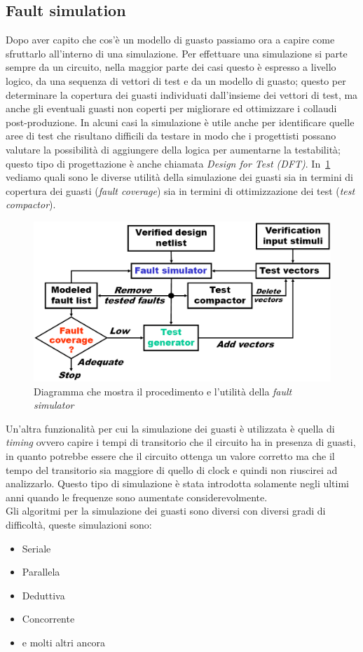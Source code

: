 \subsection{Fault simulation}
Dopo aver capito che cos'è un modello di guasto passiamo ora a capire come sfruttarlo all'interno di una simulazione.
Per effettuare una simulazione si parte sempre da un circuito, nella maggior parte dei casi questo è espresso a livello logico, da una sequenza di vettori di test e da un modello di guasto; questo per determinare la copertura dei guasti individuati dall'insieme dei vettori di test, ma anche gli eventuali guasti non coperti per migliorare ed ottimizzare i collaudi post-produzione.
In alcuni casi la simulazione è utile anche per identificare quelle aree di test che risultano difficili da testare in modo che i progettisti possano valutare la possibilità di aggiungere della logica per aumentarne la testabilità; questo tipo di progettazione è anche chiamata \emph{Design for Test (DFT)}.
In \figurename\,\ref{fig:testschema} vediamo quali sono le diverse utilità della simulazione dei guasti sia in termini di copertura dei guasti (\emph{fault coverage}) sia in termini di ottimizzazione dei test (\emph{test compactor}).
\begin{figure}
\centering
\includegraphics[scale=0.35]{img/testschema.png}
\caption{Diagramma che mostra il procedimento e l'utilità della \emph{fault simulator}}\label{fig:testschema}
\end{figure}
Un'altra funzionalità per cui la simulazione dei guasti è utilizzata è quella di \emph{timing} ovvero capire i tempi di transitorio che il circuito ha in presenza di guasti, in quanto potrebbe essere che il circuito ottenga un valore corretto ma che il tempo del transitorio sia maggiore di quello di clock e quindi non riuscirei ad analizzarlo. Questo tipo di simulazione è stata introdotta solamente negli ultimi anni quando le frequenze sono aumentate considerevolmente.\\
Gli algoritmi per la simulazione dei guasti sono diversi con diversi gradi di difficoltà, queste simulazioni sono:
\begin{itemize}
\item Seriale
\item Parallela
\item Deduttiva
\item Concorrente
\item e molti altri ancora
\end{itemize}
